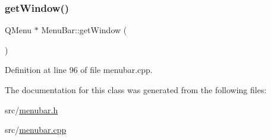 \subsubsection{\texorpdfstring{getWindow()}{getWindow()}}
{\footnotesize\ttfamily Q\+Menu $\ast$ Menu\+Bar\+::get\+Window (\begin{DoxyParamCaption}{ }\end{DoxyParamCaption})}



Definition at line 96 of file menubar.\+cpp.



The documentation for this class was generated from the following files\+:\begin{DoxyCompactItemize}
\item 
src/\mbox{\hyperlink{menubar_8h}{menubar.\+h}}\item 
src/\mbox{\hyperlink{menubar_8cpp}{menubar.\+cpp}}\end{DoxyCompactItemize}
